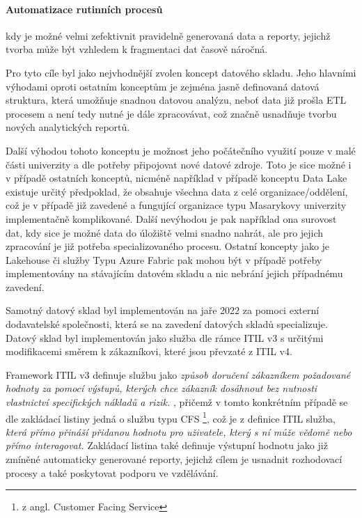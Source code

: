 \documentclass[
  digital,     %
  twoside,     %
  lof,         %
  lot,         %
]{fithesis4}
\begin{document}
\paragraph{Automatizace rutinních procesů} kdy je možné velmi zefektivnit pravidelně generovaná data a reporty, jejichž tvorba může být vzhledem k fragmentaci dat časově náročná. 

Pro tyto cíle byl jako nejvhodnější zvolen koncept datového skladu. Jeho hlavními výhodami oproti ostatním konceptům je zejména jasně definovaná datová struktura, která umožňuje snadnou datovou analýzu, neboť data již prošla ETL procesem a není tedy nutné je dále zpracovávat, což značně usnadňuje tvorbu nových analytických reportů.

Další výhodou tohoto konceptu je možnost jeho počátečního využití pouze v malé části univerzity a dle potřeby připojovat nové datové zdroje. Toto je sice možné i v případě ostatních konceptů, nicméně například v případě konceptu Data Lake existuje určitý předpoklad, že obsahuje všechna data z celé organizace/oddělení, což je v případě již zavedené a fungující organizace typu Masarykovy univerzity implementačně komplikované. Další nevýhodou je pak například ona surovost dat, kdy sice je možné data do úložiště velmi snadno nahrát, ale pro jejich zpracování je již potřeba specializovaného procesu. Ostatní koncepty jako je Lakehouse či služby Typu Azure Fabric pak mohou být v případě potřeby implementovány na stávajícím datovém skladu a nic nebrání jejich případnému zavedení.

Samotný datový sklad byl implementován na jaře 2022 za pomoci externí dodavatelské společnosti, která se na zavedení datových skladů specializuje. Datový sklad byl implementován jako služba dle rámce ITIL v3 s určitými modifikacemi směrem k zákazníkovi, které jsou převzaté z ITIL v4. 

Framework ITIL v3 definuje službu jako \emph{způsob doručení zákazníkem požadované hodnoty za pomocí výstupů, kterých chce zákazník dosáhnout bez nutnosti vlastnictví specifických nákladů a rizik.} \parencite{SyFvQA11lk1OaIec}, přičemž v tomto konkrétním případě se dle zakládací listiny jedná o službu typu CFS \footnote{z angl. Customer Facing Service}, což je z definice ITIL služba, \emph{která přímo přináší přidanou hodnotu pro uživatele, který s ní může vědomě nebo přímo interagovat.}\parencite{SyFvQA11lk1OaIec} Zakládací listina také definuje výstupní hodnotu jako již zmíněné automaticky generované reporty, jejichž cílem je usnadnit rozhodovací procesy a také poskytovat podporu ve vzdělávání.\parencite{Zechmeister2023}
\end{document}
